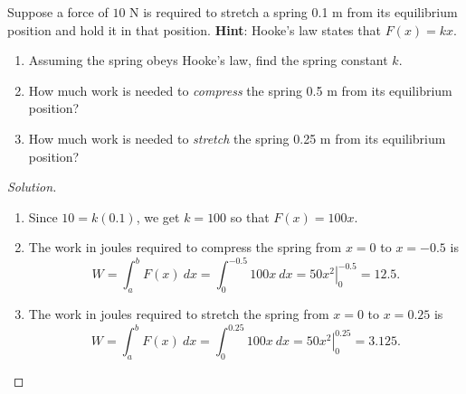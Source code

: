 \documentclass[compacto,10pt,comentarios]{aleph-notas}
\begin{document}
\begin{ejer}
    Suppose a force of $10$ N is required to stretch a spring 0.1 m from its equilibrium position and hold it in that position. \textbf{Hint}: Hooke's law states that $F(x) = kx$.
    \begin{enumerate}
        \item Assuming the spring obeys Hooke's law, find the spring constant $k$.
        \item How much work is needed to \textit{compress} the spring 0.5 m from its equilibrium position?
        \item How much work is needed to \textit{stretch} the spring 0.25 m from its equilibrium position?
    \end{enumerate}
\end{ejer}
\begin{proof}[Solution]
    \begin{enumerate}
        \item Since $10 = k (0.1)$, we get $k = 100$ so that $F(x) = 100x$.
        \item The work in joules required to compress the spring from $x=0$ to $x=-0.5$ is
        $$
            W = \int_{a}^{b} F(x) ~ dx = \int_{0}^{-0.5} 100 x ~dx = \left. 50x^{2} \right\rvert_{0}^{-0.5} = 12.5.
        $$
        \item The work in joules required to stretch the spring from $x=0$ to $x=0.25$ is
        $$
            W = \int_{a}^{b} F(x) ~ dx = \int_{0}^{0.25} 100 x ~dx = \left. 50x^{2} \right\rvert_{0}^{0.25} = 3.125.
        $$
    \end{enumerate}
\end{proof}
\end{document}
